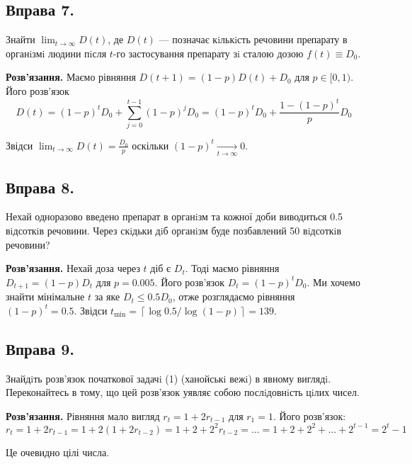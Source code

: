 \documentclass{hw_template}
\begin{document}
\subsection{Вправа 7.}
\begin{problem}
    Знайти $\lim_{t \to \infty}D(t)$, де $D(t)$ --- позначає кiлькiсть речовини препарату в органiзмi людини пiсля $t$-го застосування препарату зi сталою дозою $f(t) \equiv D_0$.
\end{problem}

\textbf{Розв'язання.} Маємо рівняння $D(t+1)=(1-p)D(t)+D_0$ для $p \in [0,1)$. Його розв'язок 
\begin{equation*}
    D(t) = (1-p)^tD_0 + \sum_{j=0}^{t-1}(1-p)^jD_0 = (1-p)^tD_0 + \frac{1-(1-p)^t}{p}D_0   
\end{equation*}

Звідси $\lim_{t \to \infty}D(t) = \frac{D_0}{p}$ оскільки $(1-p)^t \xrightarrow[t \to \infty]{} 0$.

\subsection{Вправа 8.}
\begin{problem}
    Нехай одноразово введено препарат в органiзм та кожної доби виводиться 0.5 вiдсоткiв речовини. Через скiдьки дiб органiзм буде позбавлений 50 вiдсоткiв речовини?
\end{problem}

\textbf{Розв'язання.} Нехай доза через $t$ діб є $D_t$. Тоді маємо рівняння $D_{t+1}=(1-p)D_t$ для $p=0.005$. Його розв'язок $D_t = (1-p)^tD_0$. Ми хочемо знайти мінімальне $t$ за яке $D_t \leq 0.5D_0$, отже розглядаємо рівняння $(1-p)^t = 0.5$. Звідси $t_{\min} = \left\lceil \log 0.5 \big/ \log (1-p) \right\rceil = 139$.

\subsection{Вправа 9.}
\begin{problem}
    Знайдiть розв’язок початкової задачi (1) (ханойськi вежi) в явному виглядi. Переконайтесь в тому, що цей розв’язок уявляє собою послiдовнiсть цiлих чисел.
\end{problem}

\textbf{Розв'язання.} Рівняння мало вигляд $r_t=1+2r_{t-1}$ для $r_1=1$. Його розв'язок:
\begin{equation*}
    r_t = 1 + 2r_{t-1} = 1 + 2(1 + 2r_{t-2}) = 1 + 2 + 2^2r_{t-2} = \ldots = 1 + 2 + 2^2 + \ldots + 2^{t-1} = 2^t - 1
\end{equation*}

Це очевидно цілі числа.
\end{document}
